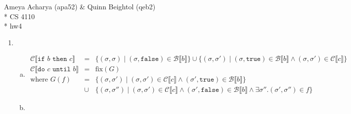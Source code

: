 \documentclass[10pt, oneside]{article}
\begin{document}
\noindent Ameya Acharya (apa52) \& Quinn Beightol (qeb2) \\*
\noindent CS 4110 \\*
\noindent hw4

\begin{enumerate}[1.]
  \item
  \begin{enumerate}[(a)] 
    \item 
    \begin{eqnarray*}
      \mathcal{C}\llbracket \texttt{if } b \texttt{ then } c \rrbracket & = & 
        \{ (\sigma, \sigma) \mid (\sigma, \texttt{false}) \in \mathcal{B}
                                                          \llbracket b \rrbracket \}
        \cup \{ (\sigma, \sigma') \mid (\sigma, \texttt{true}) \in \mathcal{B}
          \llbracket b \rrbracket \wedge (\sigma, \sigma') \in \mathcal{C}
                                                       \llbracket c \rrbracket \}\\
      \mathcal{C} \llbracket \texttt{do } c \texttt{ until } b  \rrbracket 
        & = & \text{fix}(G)\\
      \text{where } G(f) & = &
  				\{ (\sigma, \sigma') \mid (\sigma, \sigma') \in \mathcal{C} 
				                                              \llbracket c \rrbracket
		 \wedge (\sigma', \texttt{true}) \in \mathcal{B} \llbracket b \rrbracket \} \\
				& \cup & \{ (\sigma, \sigma'') \mid 
				            (\sigma, \sigma')  \in \mathcal{C} \llbracket c \rrbracket 
				     \wedge (\sigma', \texttt{false})\in \mathcal{B} \llbracket b \rrbracket
				     \wedge \exists \sigma''. (\sigma', \sigma'') \in f \}
    \end{eqnarray*}
    \item 
  \end{enumerate}


\end{enumerate}
\end{document}
